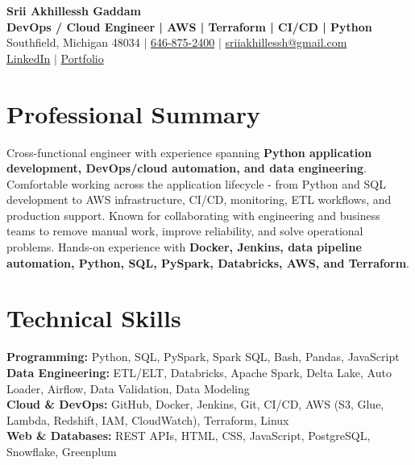 \documentclass[letterpaper,10pt]{article}
\begin{document}
\fontsize{9.35pt}{10.45pt}\selectfont

\begin{center}
    {\LARGE \textbf{Srii Akhillessh Gaddam}} \\[-1pt]
    \textbf{DevOps / Cloud Engineer | AWS | Terraform | CI/CD | Python} \\[2pt]
    Southfield, Michigan 48034 $|$
    \href{tel:6468752400}{646-875-2400} $|$
    \href{mailto:sriiakhillessh@gmail.com}{sriiakhillessh@gmail.com} \\[1pt]
    \href{https://www.linkedin.com/in/srii-akhiilessh-gaddam-b48668191/}{LinkedIn} $|$
    \href{https://sriiakhillesshg.github.io/portfolio/}{Portfolio}
\end{center}
\vspace{-8pt}

\section{Professional Summary}
\small{Cross-functional engineer with experience spanning \textbf{Python application development, DevOps/cloud automation, and data engineering}. Comfortable working across the application lifecycle - from Python and SQL development to AWS infrastructure, CI/CD, monitoring, ETL workflows, and production support. Known for collaborating with engineering and business teams to remove manual work, improve reliability, and solve operational problems. Hands-on experience with \textbf{Docker, Jenkins, data pipeline automation, Python, SQL, PySpark, Databricks, AWS, and Terraform}.}

\section{Technical Skills}
\small{
\textbf{Programming:} Python, SQL, PySpark, Spark SQL, Bash, Pandas, JavaScript \\
\textbf{Data Engineering:} ETL/ELT, Databricks, Apache Spark, Delta Lake, Auto Loader, Airflow, Data Validation, Data Modeling \\
\textbf{Cloud \& DevOps:} GitHub, Docker, Jenkins, Git, CI/CD, AWS (S3, Glue, Lambda, Redshift, IAM, CloudWatch), Terraform, Linux \\
\textbf{Web \& Databases:} REST APIs, HTML, CSS, JavaScript, PostgreSQL, Snowflake, Greenplum
}
\end{document}
